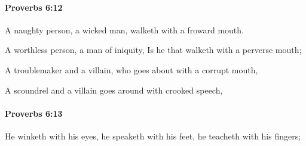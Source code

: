 		\paragraph{Proverbs 6:12} %
			\label{PROVERBS-6-12}

			A naughty person, a wicked man, walketh with a froward mouth.

			\begin{versebox}
					\item[BHS] 
					\item[ASV] A worthless person, a man of iniquity, Is he that walketh with a perverse mouth;
					\item[NIV] A troublemaker and a villain, who goes about with a corrupt mouth,
					\item[NRSV] A scoundrel and a villain goes around with crooked speech,
			\end{versebox}

		\paragraph{Proverbs 6:13} %
			\label{PROVERBS-6-13}

			He winketh with his eyes, he speaketh with his feet, he teacheth with his fingers;

